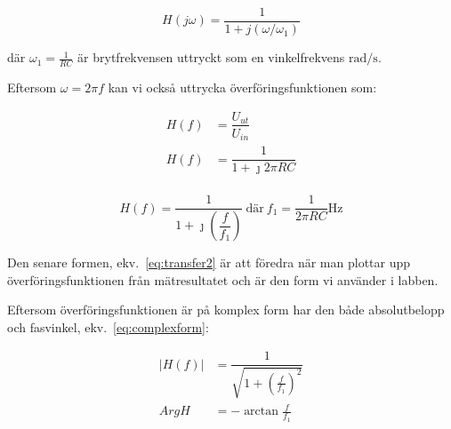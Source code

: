 \begin{equation}\label{eq:transfer}
  H(j\omega) = \dfrac{1}{1+j(\omega/\omega_1)}
\end{equation}

där $\omega_1 = \tfrac{1}{R C}$ är brytfrekvensen uttryckt som en
vinkelfrekvens $\si{\radian\per\second}$.


\par 
Eftersom $\omega = 2 \pi f$ kan vi också uttrycka överföringsfunktionen som:

\begin{equation*}
  \begin{split}
    H(f) &= \dfrac{U_{ut}}{U_{in}}        \\
    H(f) &= \dfrac{1}{1+\jmath 2 \pi R C} \\
  \end{split}
\end{equation*}

\begin{equation}\label{eq:transfer2}
  H(f) = \dfrac{1}{1+\jmath (\dfrac{f}{f_1})}\
  \text{där}\ f_1 = \dfrac{1}{2 \pi R C} \si{\Hz}
\end{equation}


\par Den senare formen, ekv.~\eqref{eq:transfer2} är att föredra när man
plottar upp överföringsfunktionen från mätresultatet och är den form vi
använder i labben.

Eftersom överföringsfunktionen är på komplex form har den både absolutbelopp
och fasvinkel, ekv.~\eqref{eq:complexform}:

\begin{equation}\label{eq:complexform}
  \begin{split}
    |H(f)| &= \dfrac{1}{\sqrt{1+{(\frac{f}{f_1})}^2}} \\
      ArgH &= -\arctan{\frac{f}{f_1}}
  \end{split}
\end{equation}




